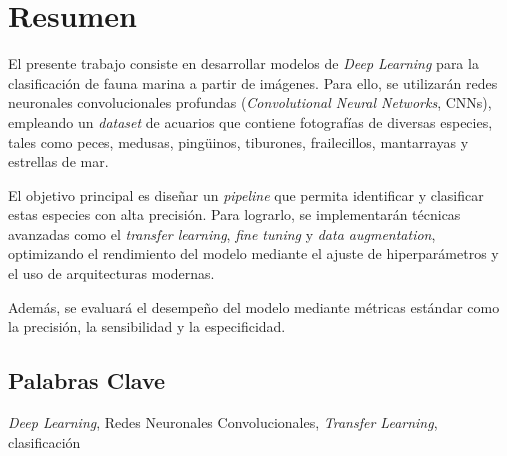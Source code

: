 \section*{Resumen}

\noindent
El presente trabajo consiste en desarrollar modelos de \textit{Deep Learning} para la clasificación de fauna marina a partir de imágenes. Para ello,
se utilizarán redes neuronales convolucionales profundas (\textit{Convolutional Neural Networks}, CNNs), empleando un \textit{dataset} de acuarios
que contiene fotografías de diversas especies, tales como peces, medusas, pingüinos, tiburones, frailecillos, mantarrayas y estrellas de mar. 

\quad

\noindent
El objetivo principal es diseñar un \textit{pipeline} que permita identificar y clasificar estas especies con alta precisión. Para lograrlo, se 
implementarán técnicas avanzadas como el \textit{transfer learning}, \textit{fine tuning} y \textit{data augmentation}, optimizando el rendimiento del modelo mediante 
el ajuste de hiperparámetros y el uso de arquitecturas modernas. \cite{chollet2021deep}

\quad

\noindent
Además, se evaluará el desempeño del modelo mediante métricas estándar como la precisión, la sensibilidad y la especificidad.

\subsection*{Palabras Clave}

\noindent
\textit{Deep Learning}, Redes Neuronales Convolucionales, \textit{Transfer Learning}, clasificación
